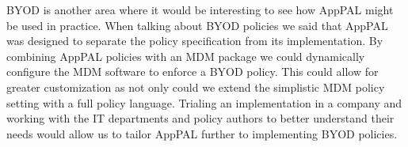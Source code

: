 \documentclass[thesis.tex]{subfiles}
\begin{document}
BYOD is another area where it would be interesting to see how AppPAL might be
used in practice. When talking about BYOD policies we said that AppPAL was
designed to separate the policy specification from its implementation. By
combining AppPAL policies with an MDM package we could dynamically configure the
MDM software to enforce a BYOD policy. This could allow for greater
customization as not only could we extend the simplistic MDM policy setting with
a full policy language. Trialing an implementation in a company and working with
the IT departments and policy authors to better understand their needs would
allow us to tailor AppPAL further to implementing BYOD policies.
\end{document}
